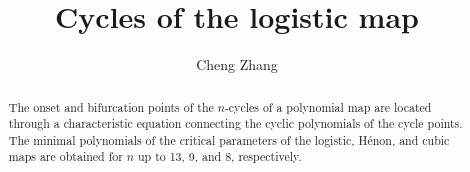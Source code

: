 \documentclass{ws-ijbc}
\begin{document}
\newcommand{\odd}{\mathrm{odd}}

\newcommand{\vct}[1]{\mathbf{#1}}




\newcommand{\vx}{\vct x}
\newcommand{\vxn}[1]{\vx^{(#1)}}
\newcommand{\Tr}{\mathrm{Tr}}
\newcommand{\Pset}{\mathcal P}
\newcommand{\NB}{N_\Pset}
\newcommand{\Rlam}{(R, \lambda)}

\newcommand{\eq}{Eq.}
\newcommand{\eqs}{Eqs.}
\newcommand{\req}[1]{(\ref{eq:#1})}
\newcommand{\refeq}[1]{\eq\,\req{#1}}
\newcommand{\refeqs}[1]{\eqs\,\req{#1}}
\newcommand{\reqsub}[2]{(\ref{eq:#1}#2)}
\newcommand{\refeqsub}[2]{\eq\,\reqsub{#1}{#2}}
\newcommand{\refeqssub}[2]{\eqs\,\reqsub{#1}{#2}}

\newcommand{\refthm}[1]{Theorem \ref{thm:#1}}
\newcommand{\refthms}[1]{Theorems \ref{thm:#1}}
\newcommand{\refsec}[1]{Section \ref{sec:#1}}
\newcommand{\refsecs}[1]{Sections \ref{sec:#1}}
\newcommand{\refapd}[1]{Appendix \ref{apd:#1}}
\newcommand{\reftab}[1]{Table \ref{tab:#1}}
\newcommand{\reftabs}[1]{Tables \ref{tab:#1}}
\newcommand{\reffig}[1]{Fig. \ref{fig:#1}}
\newcommand{\reffigs}[1]{Figs. \ref{fig:#1}}



\catchline{}{}{}{}{}




\title{Cycles of the logistic map}
\author{Cheng Zhang}
\address{Applied Physics Program \& Department of Bioengineering,
Rice University, Houston, TX 77005, USA}

\maketitle


\begin{history}
\received{}
\end{history}


\begin{abstract}
%
The onset and bifurcation points of the $n$-cycles of
  a polynomial map are located
  through a characteristic equation
  connecting the cyclic polynomials of the cycle points.
The minimal polynomials of the critical parameters
  of the logistic, H\'enon, and cubic maps are obtained
  for $n$ up to 13, 9, and 8,
  respectively.
%
\end{abstract}
\end{document}
